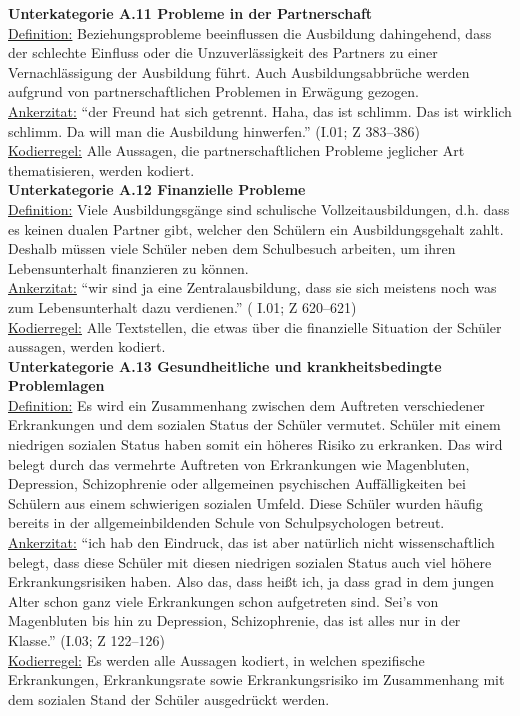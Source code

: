 \noindent
\textbf{Unterkategorie A.11 Probleme in der Partnerschaft}\\
\underline{Definition:} Beziehungsprobleme beeinflussen die Ausbildung dahingehend, dass der schlech\-te Ein\-fluss oder die Unzuverlässigkeit des Partners zu einer Vernachlässigung der Ausbildung führt. Auch Ausbildungsabbrüche werden aufgrund von partnerschaftlichen Problemen in Erwägung gezogen.\\
\underline{Ankerzitat:} "`der Freund hat sich getrennt. Haha, das ist schlimm. Das ist wirklich schlimm. Da will man die Ausbildung hinwerfen."' (I.01; Z 383--386)\\
\underline{Kodierregel:} Alle Aussagen, die partnerschaftlichen Probleme jeglicher Art thematisieren, werden kodiert.\\

\noindent
\textbf{Unterkategorie A.12 Finanzielle Probleme}\\
\underline{Definition:} Viele Ausbildungsgänge sind schulische Vollzeitausbildungen, d.h. dass es keinen dualen Partner gibt, welcher den Schülern ein Ausbildungsgehalt zahlt. Deshalb müssen viele Schüler neben dem Schulbesuch arbeiten, um ihren Lebensunterhalt finanzieren zu können.\\
\underline{Ankerzitat:} "`wir sind ja eine Zentralausbildung, dass sie sich meistens noch was zum Lebensunterhalt dazu verdienen."' ( I.01; Z 620--621)\\
\underline{Kodierregel:} Alle Textstellen, die etwas über die finanzielle Situation der Schüler aussagen, werden kodiert.\\

\noindent
\textbf{Unterkategorie A.13 Gesundheitliche und krankheitsbedingte Problemlagen}\\
\underline{Definition:} Es wird ein Zusammenhang zwischen dem Auftreten verschiedener Erkrankungen und dem sozialen Status der Schüler vermutet. Schüler mit einem niedrigen sozialen Status haben somit ein höheres Risiko zu erkranken. Das wird belegt durch das vermehrte Auftreten von Erkrankungen wie Magenbluten, Depression, Schizophrenie oder allgemeinen psychischen Auffälligkeiten bei Schülern aus einem schwierigen sozialen Umfeld. Diese Schüler wurden häufig bereits in der allgemeinbildenden Schule von Schulpsychologen betreut.\\
\underline{Ankerzitat:} "`ich hab den Eindruck, das ist aber natürlich nicht wissenschaftlich belegt, dass diese Schüler mit diesen niedrigen sozialen Status auch viel höhere Erkrankungsrisiken haben. Also das, dass heißt ich, ja dass grad in dem jungen Alter schon ganz viele Erkrankungen schon aufgetreten sind. Sei's von Magenbluten bis hin zu Depression, Schizophrenie, das ist alles nur in der Klasse."' (I.03; Z 122--126)\\
\underline{Kodierregel:} Es werden alle Aussagen kodiert, in welchen spezifische Erkrankungen, Erkrankungsrate sowie Erkrankungsrisiko im Zusammenhang mit dem sozialen Stand der Schüler ausgedrückt werden.\\

